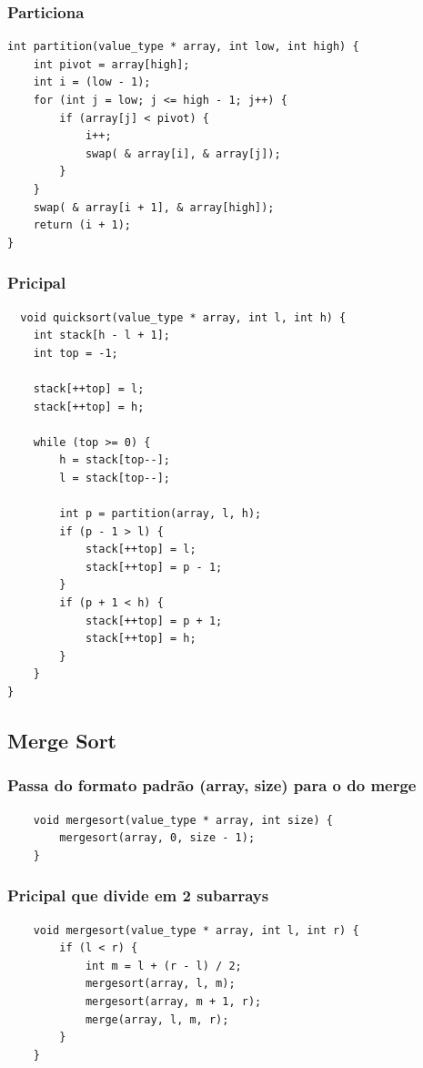 \documentclass[a4paper, 12pt]{article}
\begin{document}
\subsubsection{Particiona}
\begin{lstlisting}
int partition(value_type * array, int low, int high) {
	int pivot = array[high];
	int i = (low - 1);
	for (int j = low; j <= high - 1; j++) {
		if (array[j] < pivot) {
			i++;
			swap( & array[i], & array[j]);
		}
	}
	swap( & array[i + 1], & array[high]);
	return (i + 1);
}
\end{lstlisting}


\subsubsection{Pricipal}
\begin{lstlisting}
  void quicksort(value_type * array, int l, int h) {
	int stack[h - l + 1];
	int top = -1;
	
	stack[++top] = l;
	stack[++top] = h;
	
	while (top >= 0) {
		h = stack[top--];
		l = stack[top--];
		
		int p = partition(array, l, h);
		if (p - 1 > l) {
			stack[++top] = l;
			stack[++top] = p - 1;
		}
		if (p + 1 < h) {
			stack[++top] = p + 1;
			stack[++top] = h;
		}
	}
}

\end{lstlisting}



\subsection{Merge Sort}
\subsubsection{Passa do formato padrão (array, size) para o do merge}
\begin{lstlisting}
	void mergesort(value_type * array, int size) {
		mergesort(array, 0, size - 1);
	}
\end{lstlisting}


\subsubsection{Pricipal que divide em 2 subarrays}
\begin{lstlisting}
	void mergesort(value_type * array, int l, int r) {
		if (l < r) {
			int m = l + (r - l) / 2;
			mergesort(array, l, m);
			mergesort(array, m + 1, r);
			merge(array, l, m, r);
		}
	}
\end{lstlisting}
\end{document}
